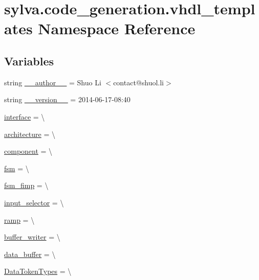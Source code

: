 \hypertarget{namespacesylva_1_1code__generation_1_1vhdl__templates}{}\section{sylva.\+code\+\_\+generation.\+vhdl\+\_\+templates Namespace Reference}
\label{namespacesylva_1_1code__generation_1_1vhdl__templates}
\subsection*{Variables}
\begin{DoxyCompactItemize}
\item 
string \hyperlink{namespacesylva_1_1code__generation_1_1vhdl__templates_ad8e49c5225352c857ca366b3bb704e1e}{\+\_\+\+\_\+author\+\_\+\+\_\+} = \textquotesingle{}Shuo Li $<$contact@shuol.\+li$>$\textquotesingle{}
\item 
string \hyperlink{namespacesylva_1_1code__generation_1_1vhdl__templates_a4c3d62a8da54a0615149a2c983c43b28}{\+\_\+\+\_\+version\+\_\+\+\_\+} = \textquotesingle{}2014-\/06-\/17-\/08\+:40\textquotesingle{}
\item 
\hyperlink{namespacesylva_1_1code__generation_1_1vhdl__templates_a32d21a8ac947fba530a2442b8d779d62}{interface} = \textbackslash{}
\item 
\hyperlink{namespacesylva_1_1code__generation_1_1vhdl__templates_a8f4755b35f916927378aac8bd397c44b}{architecture} = \textbackslash{}
\item 
\hyperlink{namespacesylva_1_1code__generation_1_1vhdl__templates_a65130034af5ea62c012dd84afaedcc34}{component} = \textbackslash{}
\item 
\hyperlink{namespacesylva_1_1code__generation_1_1vhdl__templates_af5ef74986fba631f5a0c4d9486469b69}{fsm} = \textbackslash{}
\item 
\hyperlink{namespacesylva_1_1code__generation_1_1vhdl__templates_a6a4eb4d5688beb52c3cb9d56f574477c}{fsm\+\_\+fimp} = \textbackslash{}
\item 
\hyperlink{namespacesylva_1_1code__generation_1_1vhdl__templates_a72b714bd5bf8c8da927db75843e4c997}{input\+\_\+selector} = \textbackslash{}
\item 
\hyperlink{namespacesylva_1_1code__generation_1_1vhdl__templates_a24ad74bfbabdccb2cdb0609c95323a03}{ramp} = \textbackslash{}
\item 
\hyperlink{namespacesylva_1_1code__generation_1_1vhdl__templates_a71cd66d557559e2b9262feded967362f}{buffer\+\_\+writer} = \textbackslash{}
\item 
\hyperlink{namespacesylva_1_1code__generation_1_1vhdl__templates_acbce936d6f6d2795c41daf45ef6acb3c}{data\+\_\+buffer} = \textbackslash{}
\item 
\hyperlink{namespacesylva_1_1code__generation_1_1vhdl__templates_a99451f2ccd2fb991a30cc97da54e655a}{Data\+Token\+Types} = \textbackslash{}
\end{DoxyCompactItemize}


